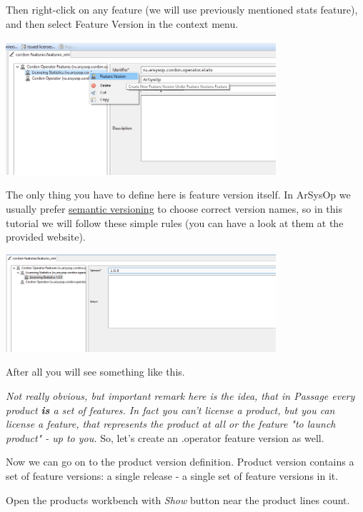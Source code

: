 \documentclass[12pt]{report}
\begin{document}
Then right-click on any feature (we will use previously mentioned stats feature), and then select Feature Version in the context menu.

\begin{center}
    \includegraphics[width=0.75\textwidth]{feature_version_create}
\end{center}

The only thing you have to define here is feature version itself. In ArSysOp we usually prefer \href{https://semver.org/}{semantic versioning} to choose correct version names,
so in this tutorial we will follow these simple rules (you can have a look at them at the provided website).

\begin{center}
    \includegraphics[width=0.75\textwidth]{feature_version_created}
\end{center}

After all you will see something like this.

\textit{Not really obvious, but important remark here is the idea, that in Passage every product \textbf{is} a set of features. In fact you can't license a product,
    but you can license a feature, that represents the product at all or the feature "to launch product" - up to you.} So, let's create an .operator feature version as well.

Now we can go on to the product version definition. Product version contains a set of feature versions: a single release - a single set of feature versions in it.

Open the products workbench with \textit{Show} button near the product lines count.
\end{document}
